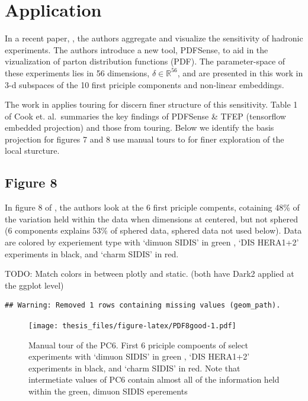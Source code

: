 \documentclass{monashthesis}
\begin{document}
\hypertarget{sec:application}{%
\section{Application}\label{sec:application}}

In a recent paper, \textcite{wang_visualizing_2018}, the authors aggregate and visualize the sensitivity of hadronic experiments. The authors introduce a new tool, PDFSense, to aid in the vizualization of parton distribution functions (PDF). The parameter-space of these experiments lies in 56 dimensions, \(\delta \in \mathbb{R}^{56}\), and are presented in this work in 3-d subspaces of the 10 first priciple components and non-linear embeddings.

The work in \textcite{cook_dynamical_2018} applies touring for discern finer structure of this sensitivity. Table 1 of Cook et. al.~summaries the key findings of PDFSense \& TFEP (tensorflow embedded projection) and those from touring. Below we identify the basis projection for figures 7 and 8 use manual tours to for finer exploration of the local sturcture.

\hypertarget{figure-8}{%
\subsection{Figure 8}\label{figure-8}}

In figure 8 of \textcite{cook_dynamical_2018}, the authors look at the 6 first priciple compents, cotaining 48\% of the variation held within the data when dimensions at centered, but not sphered (6 components explains 53\% of sphered data, sphered data not used below). Data are colored by experiement type with `dimuon SIDIS' in green , `DIS HERA1+2' experiments in black, and `charm SIDIS' in red.

TODO: Match colors in between plotly and static. (both have Dark2 applied at the ggplot level)

\begin{verbatim}
## Warning: Removed 1 rows containing missing values (geom_path).
\end{verbatim}

\begin{figure}
\centering
\texttt{[image: thesis\_files/figure-latex/PDF8good-1.pdf]}
\caption{\label{fig:PDF8good}Manual tour of the PC6. First 6 priciple compoents of select experiments with `dimuon SIDIS' in green , `DIS HERA1+2' experiments in black, and `charm SIDIS' in red. Note that intermetiate values of PC6 contain almost all of the information held within the green, dimuon SIDIS eperements}
\end{figure}
\end{document}
